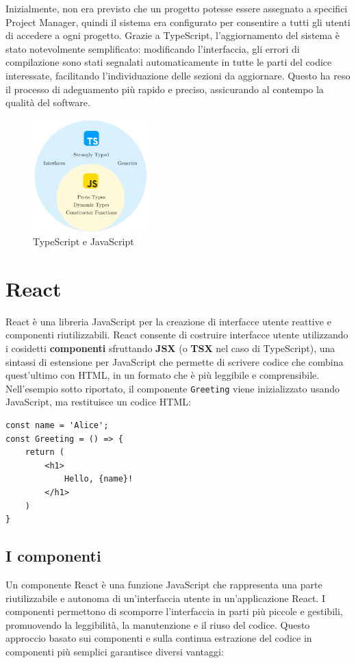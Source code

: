 \documentclass[target=bach,aauheader=,style=]{thud}
\begin{document}
\noindent Inizialmente, non era previsto che un progetto potesse essere assegnato a specifici Project Manager, quindi il sistema era configurato per consentire a tutti gli utenti di accedere a ogni progetto. Grazie a TypeScript, l'aggiornamento del sistema è stato notevolmente semplificato: modificando l'interfaccia, gli errori di compilazione sono stati segnalati automaticamente in tutte le parti del codice interessate, facilitando l'individuazione delle sezioni da aggiornare. Questo ha reso il processo di adeguamento più rapido e preciso, assicurando al contempo la qualità del software.

\begin{figure}[H]
    \centering
    \includegraphics[width=0.4\textwidth]{img/typescript_and_javascript.pdf} 
    \caption{TypeScript e JavaScript}
\end{figure}

\section{React}
React è una libreria JavaScript per la creazione di interfacce utente reattive e componenti riutilizzabili. React consente di costruire interfacce utente utilizzando i cosidetti \textbf{componenti} sfruttando \textbf{JSX} (o \textbf{TSX} nel caso di TypeScript), una sintassi di estensione per JavaScript che permette di scrivere codice che combina quest'ultimo con HTML, in un formato che è più leggibile e comprensibile. Nell'esempio sotto riportato, il componente \texttt{Greeting} viene inizializzato usando JavaScript, ma restituisce un codice HTML:

\begin{lstlisting}[language=React, caption=Esempio di codice React]
const name = 'Alice';   
const Greeting = () => {
    return (
        <h1>
            Hello, {name}!
        </h1>
    )
} 
\end{lstlisting}

\subsection{I componenti}
Un componente React è una funzione JavaScript che rappresenta una parte riutilizzabile e autonoma di un'interfaccia utente in un'applicazione React. I componenti permettono di scomporre l'interfaccia in parti più piccole e gestibili, promuovendo la leggibilità, la manutenzione e il riuso del codice. Questo approccio basato sui componenti e sulla continua estrazione del codice in componenti più semplici garantisce diversi vantaggi:
\end{document}
